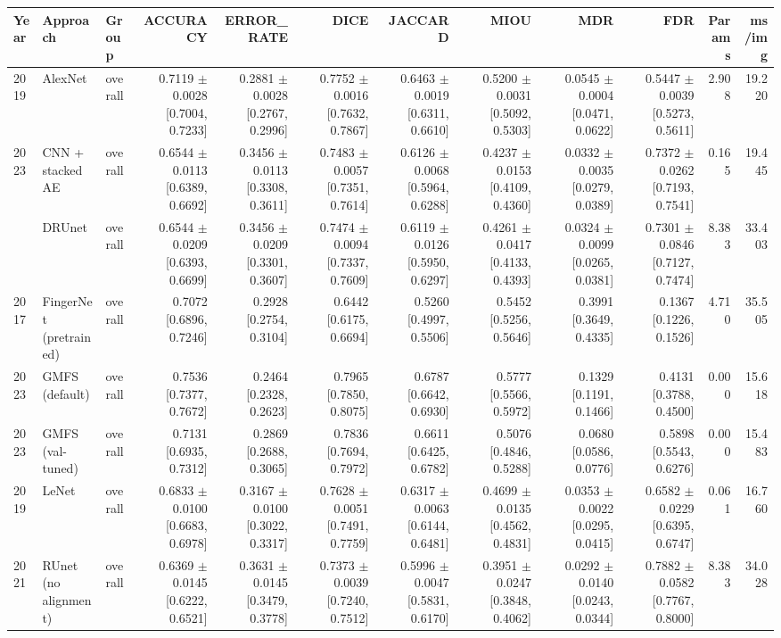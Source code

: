 \begin{table}[t]
\centering
\small
\begin{tabular}{lllrrrrrrrrr}
\toprule
Year & Approach & Group & ACCURACY & ERROR_RATE & DICE & JACCARD & MIOU & MDR & FDR & Params & ms/img \\
\midrule
2019 & AlexNet & overall & 0.7119 $\pm$ 0.0028 [0.7004, 0.7233] & 0.2881 $\pm$ 0.0028 [0.2767, 0.2996] & 0.7752 $\pm$ 0.0016 [0.7632, 0.7867] & 0.6463 $\pm$ 0.0019 [0.6311, 0.6610] & 0.5200 $\pm$ 0.0031 [0.5092, 0.5303] & 0.0545 $\pm$ 0.0004 [0.0471, 0.0622] & 0.5447 $\pm$ 0.0039 [0.5273, 0.5611] & 2.908 & 19.220 \\
2023 & CNN + stacked AE & overall & 0.6544 $\pm$ 0.0113 [0.6389, 0.6692] & 0.3456 $\pm$ 0.0113 [0.3308, 0.3611] & 0.7483 $\pm$ 0.0057 [0.7351, 0.7614] & 0.6126 $\pm$ 0.0068 [0.5964, 0.6288] & 0.4237 $\pm$ 0.0153 [0.4109, 0.4360] & 0.0332 $\pm$ 0.0035 [0.0279, 0.0389] & 0.7372 $\pm$ 0.0262 [0.7193, 0.7541] & 0.165 & 19.445 \\
 & DRUnet & overall & 0.6544 $\pm$ 0.0209 [0.6393, 0.6699] & 0.3456 $\pm$ 0.0209 [0.3301, 0.3607] & 0.7474 $\pm$ 0.0094 [0.7337, 0.7609] & 0.6119 $\pm$ 0.0126 [0.5950, 0.6297] & 0.4261 $\pm$ 0.0417 [0.4133, 0.4393] & 0.0324 $\pm$ 0.0099 [0.0265, 0.0381] & 0.7301 $\pm$ 0.0846 [0.7127, 0.7474] & 8.383 & 33.403 \\
2017 & FingerNet (pretrained) & overall & 0.7072 [0.6896, 0.7246] & 0.2928 [0.2754, 0.3104] & 0.6442 [0.6175, 0.6694] & 0.5260 [0.4997, 0.5506] & 0.5452 [0.5256, 0.5646] & 0.3991 [0.3649, 0.4335] & 0.1367 [0.1226, 0.1526] & 4.710 & 35.505 \\
2023 & GMFS (default) & overall & 0.7536 [0.7377, 0.7672] & 0.2464 [0.2328, 0.2623] & 0.7965 [0.7850, 0.8075] & 0.6787 [0.6642, 0.6930] & 0.5777 [0.5566, 0.5972] & 0.1329 [0.1191, 0.1466] & 0.4131 [0.3788, 0.4500] & 0.000 & 15.618 \\
2023 & GMFS (val-tuned) & overall & 0.7131 [0.6935, 0.7312] & 0.2869 [0.2688, 0.3065] & 0.7836 [0.7694, 0.7972] & 0.6611 [0.6425, 0.6782] & 0.5076 [0.4846, 0.5288] & 0.0680 [0.0586, 0.0776] & 0.5898 [0.5543, 0.6276] & 0.000 & 15.483 \\
2019 & LeNet & overall & 0.6833 $\pm$ 0.0100 [0.6683, 0.6978] & 0.3167 $\pm$ 0.0100 [0.3022, 0.3317] & 0.7628 $\pm$ 0.0051 [0.7491, 0.7759] & 0.6317 $\pm$ 0.0063 [0.6144, 0.6481] & 0.4699 $\pm$ 0.0135 [0.4562, 0.4831] & 0.0353 $\pm$ 0.0022 [0.0295, 0.0415] & 0.6582 $\pm$ 0.0229 [0.6395, 0.6747] & 0.061 & 16.760 \\
2021 & RUnet (no alignment) & overall & 0.6369 $\pm$ 0.0145 [0.6222, 0.6521] & 0.3631 $\pm$ 0.0145 [0.3479, 0.3778] & 0.7373 $\pm$ 0.0039 [0.7240, 0.7512] & 0.5996 $\pm$ 0.0047 [0.5831, 0.6170] & 0.3951 $\pm$ 0.0247 [0.3848, 0.4062] & 0.0292 $\pm$ 0.0140 [0.0243, 0.0344] & 0.7882 $\pm$ 0.0582 [0.7767, 0.8000] & 8.383 & 34.028 \\

\end{tabular}
\end{table}
